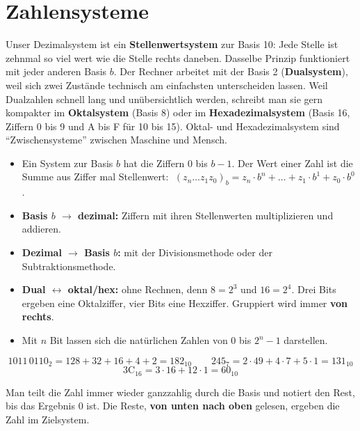 \section{Zahlensysteme}
\worum
Unser Dezimalsystem ist ein \textbf{Stellenwertsystem} zur Basis 10: Jede Stelle ist zehnmal so viel wert wie die Stelle rechts daneben. Dasselbe Prinzip funktioniert mit jeder anderen Basis $b$. Der Rechner arbeitet mit der Basis 2 (\textbf{Dualsystem}), weil sich zwei Zustände technisch am einfachsten unterscheiden lassen. Weil Dualzahlen schnell lang und unübersichtlich werden, schreibt man sie gern kompakter im \textbf{Oktalsystem} (Basis 8) oder im \textbf{Hexadezimalsystem} (Basis 16, Ziffern 0 bis 9 und A bis F für 10 bis 15). Oktal- und Hexadezimalsystem sind \enquote{Zwischensysteme} zwischen Maschine und Mensch.

\begin{merke}
\begin{itemize}[itemsep=0.1em]
\item Ein System zur Basis $b$ hat die Ziffern $0$ bis $b-1$. Der Wert einer Zahl ist die Summe aus Ziffer mal Stellenwert:
$\;(z_n \ldots z_1 z_0)_b = z_n \cdot b^n + \ldots + z_1 \cdot b^1 + z_0 \cdot b^0$.
\item \textbf{Basis $b$ $\to$ dezimal:} Ziffern mit ihren Stellenwerten multiplizieren und addieren.
\item \textbf{Dezimal $\to$ Basis $b$:} mit der Divisionsmethode oder der Subtraktionsmethode.
\item \textbf{Dual $\leftrightarrow$ oktal/hex:} ohne Rechnen, denn $8 = 2^3$ und $16 = 2^4$. Drei Bits ergeben eine Oktalziffer, vier Bits eine Hexziffer. Gruppiert wird immer \textbf{von rechts}.
\item Mit $n$ Bit lassen sich die natürlichen Zahlen von $0$ bis $2^n - 1$ darstellen.
\end{itemize}
\end{merke}

\beispiele
{}
\[
1011\,0110_2 = 128 + 32 + 16 + 4 + 2 = 182_{10}
\qquad
245_7 = 2 \cdot 49 + 4 \cdot 7 + 5 \cdot 1 = 131_{10}
\]
\[
\mathrm{3C}_{16} = 3 \cdot 16 + 12 \cdot 1 = 60_{10}
\]

Man teilt die Zahl immer wieder ganzzahlig durch die Basis und notiert den Rest, bis das Ergebnis 0 ist. Die Reste, \textbf{von unten nach oben} gelesen, ergeben die Zahl im Zielsystem.

